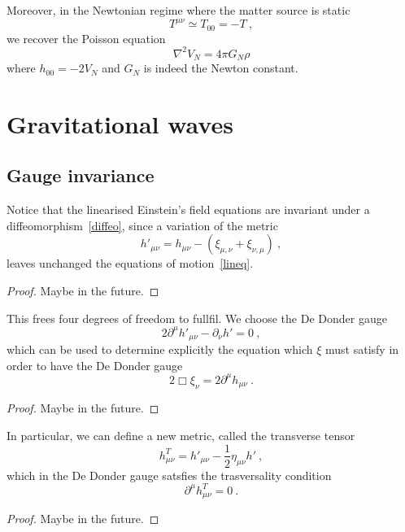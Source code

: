    Moreover, in the Newtonian regime where the matter source is static 
    \begin{equation*}
        T^{\mu\nu} \simeq T_{00} = - T ~,
    \end{equation*}
    we recover the Poisson equation
    \begin{equation*}
        \nabla^2 V_N = 4 \pi G_N \rho
    \end{equation*}
    where $h_{00} = - 2 V_N$ and $G_N$ is indeed the Newton constant.

\chapter{Gravitational waves}

\section{Gauge invariance}

    Notice that the linearised Einstein's field equations are invariant under a diffeomorphism~\eqref{diffeo}, since a variation of the metric 
    \begin{equation*}
        {h'}_{\mu\nu} = h_{\mu\nu} - (\xi_{\mu,\nu} + \xi_{\nu,\mu}) ~,
    \end{equation*}
    leaves unchanged the equations of motion~\eqref{lineq}.
    \begin{proof}
        Maybe in the future.
    \end{proof}

    This frees four degrees of freedom to fullfil. We choose the De Donder gauge 
    \begin{equation*}
        2 \partial^\mu {h'}_{\mu\nu} - \partial_\nu h' = 0 ~,
    \end{equation*}
    which can be used to determine explicitly the equation which $\xi$ must satisfy in order to have the De Donder gauge 
    \begin{equation*}
        2 \Box \xi_\nu = 2 \partial^\mu h_{\mu\nu} ~.
    \end{equation*}
    \begin{proof}
        Maybe in the future.
    \end{proof}

    In particular, we can define a new metric, called the transverse tensor
    \begin{equation*}
        h^T_{\mu\nu} = {h'}_{\mu\nu} - \frac{1}{2} \eta_{\mu\nu} h' ~,
    \end{equation*}
    which in the De Donder gauge satsfies the trasversality condition 
    \begin{equation*}
        \partial^\mu h^T_{\mu\nu} = 0 ~.
    \end{equation*}
    \begin{proof}
        Maybe in the future.
    \end{proof}

